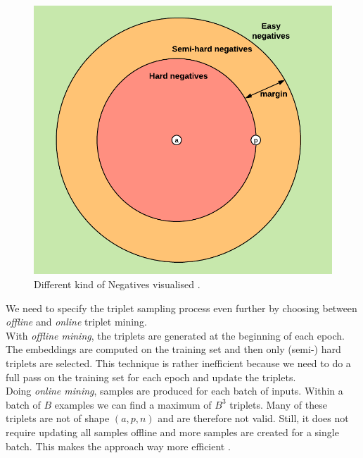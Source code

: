 \begin{figure}[ht] 
        \centering \includegraphics[width=1\columnwidth]{figures/triplet_mining.png}
        \caption{\label{fig:quellemussrein}Different kind of Negatives visualised \protect\cite{moindrot}.}
\end{figure}


\noindent We need to specify the triplet sampling process even further by choosing between \textit{offline} and \textit{online} triplet mining. \\
With \textit{offline mining}, the triplets are generated at the beginning of each epoch. The embeddings are computed on the training set and then only (semi-) hard triplets are selected. This technique is rather inefficient because we need to do a full pass on the training set for each epoch and update the triplets. \\
Doing \textit{online mining}, samples are produced for each batch of inputs. Within a batch of \(B\) examples we can find a maximum of \(B^3\) triplets. Many of these triplets are not of shape \((a,p,n)\) and are therefore not valid. Still, it does not require updating all samples offline and more samples are created for a single batch. This makes the approach way more efficient \cite{moindrot}.

